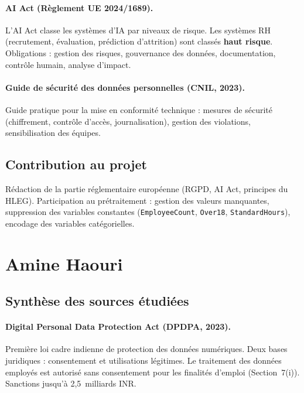 \documentclass[12pt,a4paper]{article}
\begin{document}
\paragraph{AI Act (Règlement UE 2024/1689).}
L'AI Act classe les systèmes d'IA par niveaux de risque. Les systèmes RH (recrutement, évaluation, prédiction d'attrition) sont classés \textbf{haut risque}. Obligations : gestion des risques, gouvernance des données, documentation, contrôle humain, analyse d'impact.

\paragraph{Guide de sécurité des données personnelles (CNIL, 2023).}
Guide pratique pour la mise en conformité technique : mesures de sécurité (chiffrement, contrôle d'accès, journalisation), gestion des violations, sensibilisation des équipes.

\subsection{Contribution au projet}

Rédaction de la partie réglementaire européenne (RGPD, AI Act, principes du HLEG). Participation au prétraitement : gestion des valeurs manquantes, suppression des variables constantes (\texttt{EmployeeCount}, \texttt{Over18}, \texttt{StandardHours}), encodage des variables catégorielles.

\section{Amine Haouri}

\subsection{Synthèse des sources étudiées}

\paragraph{Digital Personal Data Protection Act (DPDPA, 2023).}
Première loi cadre indienne de protection des données numériques. Deux bases juridiques : consentement et utilisations légitimes. Le traitement des données employés est autorisé sans consentement pour les finalités d'emploi (Section~7(i)). Sanctions jusqu'à 2,5~milliards INR.
\end{document}
